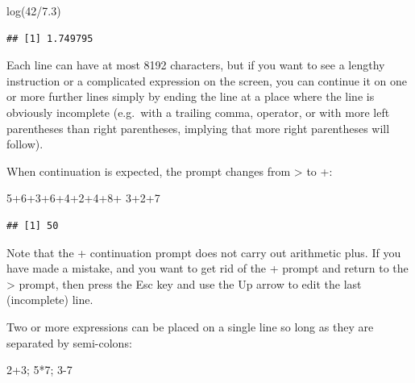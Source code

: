 \documentclass[
]{book}
\newenvironment{Shaded}{\begin{snugshade}}{\end{snugshade}}
\newcommand{\DecValTok}[1]{\textcolor[rgb]{0.00,0.00,0.81}{#1}}
\newcommand{\FloatTok}[1]{\textcolor[rgb]{0.00,0.00,0.81}{#1}}
\newcommand{\FunctionTok}[1]{\textcolor[rgb]{0.00,0.00,0.00}{#1}}
\newcommand{\NormalTok}[1]{#1}
\newcommand{\SpecialCharTok}[1]{\textcolor[rgb]{0.00,0.00,0.00}{#1}}
\theoremstyle{definition}
\theoremstyle{definition}
\theoremstyle{definition}
\theoremstyle{definition}
\theoremstyle{remark}
\begin{document}
\begin{Shaded}
\begin{Highlighting}[]
\FunctionTok{log}\NormalTok{(}\DecValTok{42}\SpecialCharTok{/}\FloatTok{7.3}\NormalTok{)}
\end{Highlighting}
\end{Shaded}

\begin{verbatim}
## [1] 1.749795
\end{verbatim}

Each line can have at most 8192 characters, but if you want to see a lengthy instruction or a complicated expression on the screen, you can continue it on one or more further lines simply by ending the line at a place where the line is obviously incomplete (e.g.~with a trailing comma, operator, or with more left parentheses than right parentheses, implying that more right parentheses will follow).

When continuation is expected, the prompt changes from \textgreater{} to +:

\begin{Shaded}
\begin{Highlighting}[]
\DecValTok{5}\SpecialCharTok{+}\DecValTok{6}\SpecialCharTok{+}\DecValTok{3}\SpecialCharTok{+}\DecValTok{6}\SpecialCharTok{+}\DecValTok{4}\SpecialCharTok{+}\DecValTok{2}\SpecialCharTok{+}\DecValTok{4}\SpecialCharTok{+}\DecValTok{8}\SpecialCharTok{+}
\DecValTok{3}\SpecialCharTok{+}\DecValTok{2}\SpecialCharTok{+}\DecValTok{7}
\end{Highlighting}
\end{Shaded}

\begin{verbatim}
## [1] 50
\end{verbatim}

Note that the + continuation prompt does not carry out arithmetic plus. If you have made a mistake, and you want to get rid of the + prompt and return to the \textgreater{} prompt, then press the Esc key and use the Up arrow to edit the last (incomplete) line.

Two or more expressions can be placed on a single line so long as they are separated by semi-colons:

\begin{Shaded}
\begin{Highlighting}[]
\DecValTok{2}\SpecialCharTok{+}\DecValTok{3}\NormalTok{; }\DecValTok{5}\SpecialCharTok{*}\DecValTok{7}\NormalTok{; }\DecValTok{3{-}7}
\end{Highlighting}
\end{Shaded}
\end{document}
